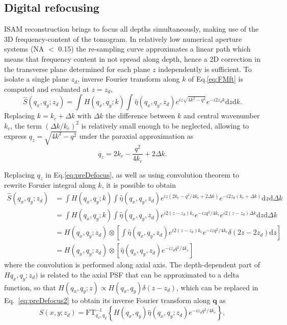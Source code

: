 \subsection{Digital refocusing}

ISAM reconstruction brings to focus all depths simultaneously, making use of the 3D frequency-content of the tomogram. In relatively low numerical aperture systems (NA $<$ 0.15) the re-sampling curve approximates a linear path which means that frequency content in not spread along depth, hence a 2D correction in the transverse plane determined for each plane $z$ independently is sufficient. To isolate a single plane $z_d$, inverse Fourier transform along $k$ of Eq.\eqref{eq:FMft} is computed and evaluated at $z=z_d$,
\begin{equation}\label{eq:preDefocus}
    \hat{S}(q_x,q_y; z_d) = \int H(q_x, q_y; k) \int \hat{\eta}(q_x,q_y, z_d) e^{iz\sqrt{4k^2-q^2}} e^{-i2z_dk} \text{d}z\text{d}k.
\end{equation}
Replacing $k=k_c + \Delta k$ with $\Delta k$ the difference between $k$ and central wavenumber $k_c$, the term $(\Delta k/k_c)^2$ is relatively small enough to be neglected, allowing to express $q_z=\sqrt{4k^2-q^2}$ under the paraxial approximation as
\begin{equation}\label{eq:qzAprox}
    q_z = 2k_c - \frac{q^2}{4k_c} + 2\Delta k.
\end{equation}

Replacing $q_z$ in Eq.\eqref{eq:preDefocus}, as well as using convolution theorem to rewrite Foruier integral along $k$, it is possible to obtain
\begin{align}\label{eq:preDefocus2}
    \hat{S}(q_x,q_y; z_d) &= \int H(q_x, q_y; k) \int \hat{\eta}(q_x,q_y, z_d) e^{iz(2k_c - q^2/4k_c + 2\Delta k)} e^{-i2z_d(k_c+\Delta k)} \text{d}z\text{d}\Delta k \nonumber \\
    &= \int H(q_x, q_y; k) \int \hat{\eta}(q_x,q_y, z_d) e^{i2(z-z_d)k_c} e^{-izq^2/4k_c} e^{i2(z-z_d)\Delta k} \text{d}z\text{d}\Delta k \nonumber \\
    &= H(q_x, q_y; z_d) \otimes \left[ \int \hat{\eta}(q_x,q_y, z_d) e^{i2(z-z_d)k_c} e^{-izq^2/4k_c}  \delta(2z-2z_d) \text{d}z\right] \nonumber \\
    &= H(q_x, q_y; z_d) \otimes \left[ \hat{\eta}(q_x,q_y, z_d) e^{-iz_dq^2/4k_c}  \right]
\end{align}
where the convolution is performed along axial axis. The depth-dependent part of $Hq_x,q_y;z_d)$ is related to the axial PSF that can be approximated to a delta function, so that $H(q_x, q_y; z) \propto H(q_x, q_y)\delta(z-z_d)$, which can be replaced in Eq.~\eqref{eq:preDefocus2} to obtain its inverse Fourier transform along $\mathbf{q}$ as
\begin{equation}\label{eq:defocus}
    S(x, y; z_d) = \text{FT}^{-1}_{q_x, q_y}\left\{H(q_x, q_y)\hat{\eta}(q_x, q_y; z_d) e^{-iz_dq^2/4k_c}\right\},
\end{equation}

